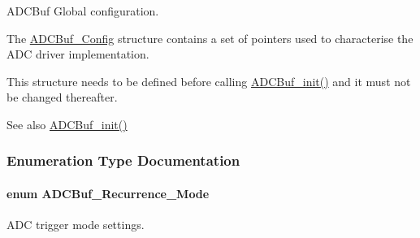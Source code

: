 A\+D\+C\+Buf Global configuration. 

The \hyperlink{struct_a_d_c_buf___config}{A\+D\+C\+Buf\+\_\+\+Config} structure contains a set of pointers used to characterise the A\+D\+C driver implementation.

This structure needs to be defined before calling \hyperlink{_a_d_c_buf_8h_a88a0ab421304465b22417a7adef6c0c2}{A\+D\+C\+Buf\+\_\+init()} and it must not be changed thereafter.

\begin{DoxySeeAlso}{See also}
\hyperlink{_a_d_c_buf_8h_a88a0ab421304465b22417a7adef6c0c2}{A\+D\+C\+Buf\+\_\+init()} 
\end{DoxySeeAlso}


\subsubsection{Enumeration Type Documentation}
\paragraph[{A\+D\+C\+Buf\+\_\+\+Recurrence\+\_\+\+Mode}]{\setlength{\rightskip}{0pt plus 5cm}enum {\bf A\+D\+C\+Buf\+\_\+\+Recurrence\+\_\+\+Mode}}\label{_a_d_c_buf_8h_af15cc4961b02af48216132c2b8bc88f1}


A\+D\+C trigger mode settings. 


